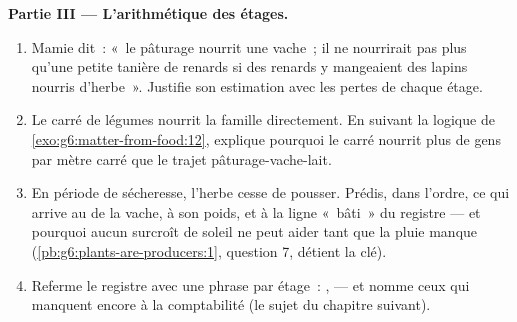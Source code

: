 \begin{problem}
\medskip\noindent\textbf{Partie III --- L'arithmétique des
étages.}
\begin{enumerate}[resume]
  \item Mamie dit~: «~le pâturage nourrit une vache~; il ne
        nourrirait pas plus qu'une petite tanière de renards si des
        renards y mangeaient des lapins nourris d'herbe~». Justifie
        son estimation avec les pertes de chaque étage.
  \item Le carré de légumes nourrit la famille directement. En
        suivant la logique de \cref{exo:g6:matter-from-food:12},
        explique pourquoi le carré nourrit plus de gens par mètre
        carré que le trajet pâturage-vache-lait.
  \item En période de sécheresse, l'herbe cesse de pousser. Prédis,
        dans l'ordre, ce qui arrive au  de la vache, à son
        poids, et à la ligne «~bâti~» du registre --- et pourquoi
        aucun surcroît de soleil ne peut aider tant que la pluie
        manque (\cref{pb:g6:plants-are-producers:1}, question 7,
        détient la clé).
  \item Referme le registre avec une phrase par étage~:
        ,  --- et nomme ceux qui manquent
        encore à la comptabilité (le sujet du chapitre suivant).
\end{enumerate}
\end{problem}
